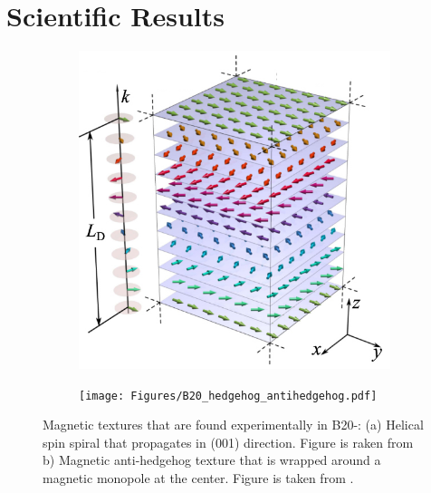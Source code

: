 \documentclass [a4paper, 12pt]{article}
\begin{document}
\section{Scientific Results}

\begin{figure}[h]
\centering
\begin{subfigure}[b]{0.49\textwidth}
   \includegraphics[width=\textwidth]{Figures/helicalspiral.png}
   \caption{}
   \label{fig:mnge_spiral}
\end{subfigure}
\begin{subfigure}[b]{0.49\textwidth}
	\texttt{[image: Figures/B20\_hedgehog\_antihedgehog.pdf]}
   \caption{}
   \label{fig:mnge_3q}
\end{subfigure}
	\caption{Magnetic textures that are found experimentally in B20-:  (a) Helical
	spin spiral that propagates in (001) direction. Figure is raken from \cite{rybakov_new_2016} b) 
	Magnetic anti-hedgehog texture that is wrapped around a magnetic monopole at the center. Figure is taken from \cite{zhang_electric_2016}.}
\label{fig:mnge_spiral_and_3q}
\end{figure}
\end{document}
